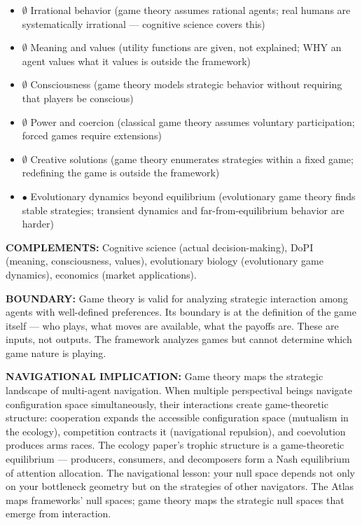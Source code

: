 \begin{itemize}[nosep,leftmargin=*]
  \item $\emptyset$ Irrational behavior (game theory assumes rational agents; real humans are systematically irrational — cognitive science covers this)
  \item $\emptyset$ Meaning and values (utility functions are given, not explained; WHY an agent values what it values is outside the framework)
  \item $\emptyset$ Consciousness (game theory models strategic behavior without requiring that players be conscious)
  \item $\emptyset$ Power and coercion (classical game theory assumes voluntary participation; forced games require extensions)
  \item $\emptyset$ Creative solutions (game theory enumerates strategies within a fixed game; redefining the game is outside the framework)
  \item $\bullet$ Evolutionary dynamics beyond equilibrium (evolutionary game theory finds stable strategies; transient dynamics and far-from-equilibrium behavior are harder)
\end{itemize}


\textbf{COMPLEMENTS:} Cognitive science (actual decision-making), DoPI (meaning, consciousness, values), evolutionary biology (evolutionary game dynamics), economics (market applications).


\textbf{BOUNDARY:} Game theory is valid for analyzing strategic interaction among agents with well-defined preferences. Its boundary is at the definition of the game itself — who plays, what moves are available, what the payoffs are. These are inputs, not outputs. The framework analyzes games but cannot determine which game nature is playing.


\textbf{NAVIGATIONAL IMPLICATION:} Game theory maps the strategic landscape of multi-agent navigation. When multiple perspectival beings navigate configuration space simultaneously, their interactions create game-theoretic structure: cooperation expands the accessible configuration space (mutualism in the ecology), competition contracts it (navigational repulsion), and coevolution produces arms races. The ecology paper's trophic structure is a game-theoretic equilibrium — producers, consumers, and decomposers form a Nash equilibrium of attention allocation. The navigational lesson: your null space depends not only on your bottleneck geometry but on the strategies of other navigators. The Atlas maps frameworks' null spaces; game theory maps the strategic null spaces that emerge from interaction.


